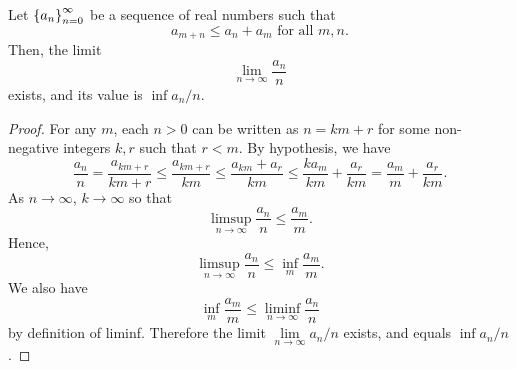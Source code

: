 \documentclass[10pt,twoside,draft]{book}
\begin{document}
\begin{lemma}
  \citep[Theorem 4.9]{walters}
  Let $\left \{ a_n \right \}^{\infty}_{n = 0}$ be a sequence of real numbers such that 
  \begin{equation*}
    a_{m+n} \leq a_n + a_m \mbox{ for all } m,n.
  \end{equation*}
  Then, the limit
  \begin{equation*}
    \lim\limits_{n \to \infty} \frac{a_n}{n} 
  \end{equation*}
  exists, and its value is $\inf a_n / n$.
  \begin{proof}
    For any $m$, each $n > 0$ can be written as $n = km + r$ for some non-negative integers $k,r$ such that $r < m$.
    By hypothesis, we have 
    \begin{equation*}
      \frac{a_n}{n}
      = \frac{a_{km + r}}{km + r}
      \leq \frac{a_{km + r}}{km}
      \leq \frac{a_{km} + a_r}{km}
      \leq \frac{k a_{m}}{km} + \frac{a_r}{km}
      = \frac{a_{m}}{m} + \frac{a_r}{km}.
    \end{equation*}
    As $n \to \infty$, $k \to \infty$ so that
    \begin{equation*}
      \limsup\limits_{n \to \infty} \frac{a_n}{n} \leq \frac{a_m}{m}.
    \end{equation*}
    Hence,
    \begin{equation*}
      \limsup\limits_{n \to \infty} \frac{a_n}{n} \leq \inf\limits_m \frac{a_m}{m}.
    \end{equation*}
    We also have
    \begin{equation*}
      \inf\limits_{m} \frac{a_m}{m} \leq \liminf\limits_{n \to \infty} \frac{a_n}{n}
    \end{equation*}
    by definition of liminf.
    Therefore the limit $\lim\limits_{n \to \infty} a_n/n$ exists, and equals $\inf a_n/n$.
  \end{proof}
\end{lemma}
\end{document}
